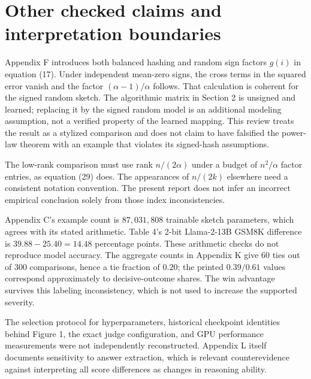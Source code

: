 \documentclass[10pt]{article}
\begin{document}
\section*{Other checked claims and interpretation boundaries}
Appendix F introduces both balanced hashing and random sign factors \(g(i)\) in equation (17). Under independent mean-zero signs, the cross terms in the squared error vanish and the factor \((\alpha-1)/\alpha\) follows. That calculation is coherent for the signed random sketch. The algorithmic matrix in Section 2 is unsigned and learned; replacing it by the signed random model is an additional modeling assumption, not a verified property of the learned mapping. This review treats the result as a stylized comparison and does not claim to have falsified the power-law theorem with an example that violates its signed-hash assumptions.\par
The low-rank comparison must use rank \(n/(2\alpha)\) under a budget of \(n^2/\alpha\) factor entries, as equation (29) does. The appearances of \(n/(2k)\) elsewhere need a consistent notation convention. The present report does not infer an incorrect empirical conclusion solely from those index inconsistencies.\par
Appendix C’s example count is \(87{,}031{,}808\) trainable sketch parameters, which agrees with its stated arithmetic. Table 4’s 2-bit Llama-2-13B GSM8K difference is \(39.88-25.40=14.48\) percentage points. These arithmetic checks do not reproduce model accuracy. The aggregate counts in Appendix K give 60 ties out of 300 comparisons, hence a tie fraction of \(0.20\); the printed \(0.39/0.61\) values correspond approximately to decisive-outcome shares. The win advantage survives this labeling inconsistency, which is not used to increase the supported severity.\par
The selection protocol for hyperparameters, historical checkpoint identities behind Figure 1, the exact judge configuration, and GPU performance measurements were not independently reconstructed. Appendix L itself documents sensitivity to answer extraction, which is relevant counterevidence against interpreting all score differences as changes in reasoning ability.\par
\end{document}
